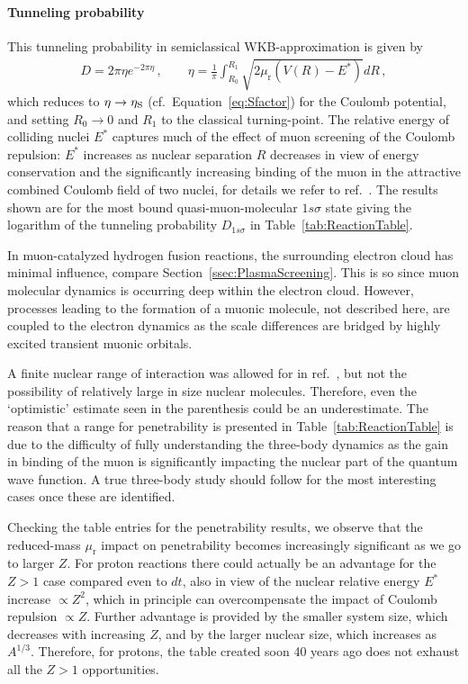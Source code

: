 \documentclass[particles,article,accept,pdftex,moreauthors]{Definitions/mdpi}
\begin{document}
\paragraph*{\bf Tunneling probability}
This tunneling probability in semiclassical WKB-approximation is given by 
\begin{align}
D=2\pi\eta e^{-2\pi\eta}\,,\qquad \eta=\frac{1}{\pi}\int_{R_0}^{R_1}\sqrt{2\mu_\mathrm{r}(V(R)-E^*)}dR\,,
\end{align}
which reduces to $\eta\to\eta_{\rm S}$ (cf.~Equation~\eqref{eq:Sfactor}) for the Coulomb potential, and setting $R_0\to0$ and $R_1$ to the classical turning-point. The relative energy of colliding nuclei $E^*$ captures much of the effect of muon screening of the Coulomb repulsion: $E^*$ increases as nuclear separation $R$ decreases in view of energy conservation and the significantly increasing binding of the muon in the attractive combined Coulomb field of two nuclei, for details we refer to ref.~\cite{Harley:1988wp}. The results shown are for the most bound quasi-muon-molecular $1s\sigma$ state giving the logarithm of the tunneling probability $D_{1s\sigma}$ in Table~\ref{tab:ReactionTable}. 

In muon-catalyzed hydrogen fusion reactions, the surrounding electron cloud has minimal influence, compare Section~\ref{ssec:PlasmaScreening}. This is so since muon molecular dynamics is occurring deep within the electron cloud. However, processes leading to the formation of a muonic molecule, not described here, are coupled to the electron dynamics as the scale differences are bridged by highly excited transient muonic orbitals.

A finite nuclear range of interaction was allowed for in ref.~\cite{Harley:1988wp}, but not the possibility of relatively large in size nuclear molecules. Therefore, even the `optimistic' estimate seen in the parenthesis could be an underestimate. The reason that a range for penetrability is presented in Table~\ref{tab:ReactionTable} is due to the difficulty of fully understanding the three-body dynamics as the gain in binding of the muon is significantly impacting the nuclear part of the quantum wave function. A true three-body study should follow for the most interesting cases once these are identified.

Checking the table entries for the penetrability results, we observe that the reduced-mass $\mu_\mathrm{r}$ impact on penetrability becomes increasingly significant as we go to larger $Z$. For proton reactions there could actually be an advantage for the $Z > 1$ case compared even to $dt$, also in view of the nuclear relative energy $E^*$ increase $\propto Z^2$, which in principle can overcompensate the impact of Coulomb repulsion $\propto Z$. Further advantage is provided by the smaller system size, which decreases with increasing $Z$, and by the larger nuclear size, which increases as $A^{1/3}$. Therefore, for protons, the table created soon 40 years ago does not exhaust all the $Z>1$ opportunities.
\end{document}
